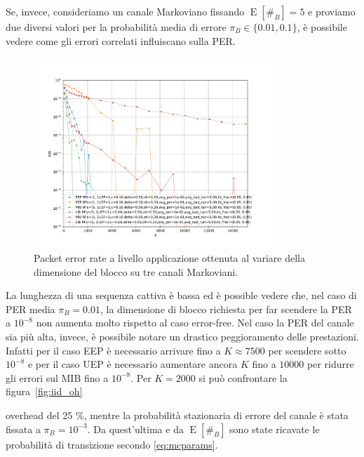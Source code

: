 \documentclass[italian, a4paper, 12pt]{article}
\newcommand{\E}[1]{\operatorname{E}\left[#1\right]}
\newcommand{\EnB}{\E{\#_B}}
\begin{document}
Se, invece, consideriamo un canale Markoviano fissando $\EnB = 5$ e
proviamo due diversi valori per la probabilità media di errore $\pi_B
\in \{0.01, 0.1\}$, è possibile vedere come gli errori correlati
influiscano sulla PER.
%
\begin{figure}[htb]
  \centering
  \includegraphics[width=0.8\textwidth]{plot_markov_br5}
  \caption{Packet error rate a livello applicazione ottenuta al
    variare della dimensione del blocco su tre canali Markoviani.}
  \label{fig:markov_br5}
\end{figure}
%
La lunghezza di una sequenza cattiva è bassa ed è possible vedere che,
nel caso di PER media $\pi_B = 0.01$, la dimensione di blocco
richiesta per far scendere la PER a $10^{-8}$ non aumenta molto
rispetto al caso error-free. Nel caso la PER del canale sia più alta,
invece, è possibile notare un drastico peggioramento delle
prestazioni. Infatti per il caso EEP è necessario arrivare fino a $K
\approx 7500$ per scendere sotto $10^{-8}$ e per il caso UEP è
necessario aumentare ancora $K$ fino a $10000$ per ridurre gli errori
sul MIB fino a $10^{-8}$.
%
Per $K = 2000$ si può confrontare la figura~\ref{fig:iid_oh} 


overhead del 25 \%, mentre la probabilità stazionaria di errore del
canale è stata fissata a $\pi_B = 10^{-3}$. Da quest'ultima e da
$\EnB$ sono state ricavate le probabilità di transizione secondo
\eqref{eq:mcparams}.
\end{document}
